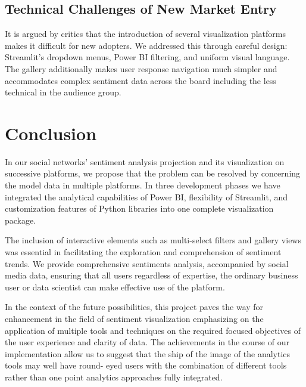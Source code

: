 \documentclass[conference]{IEEEtran}
\begin{document}
\subsection{Technical Challenges of New Market Entry}

It is argued by critics that the introduction of several visualization platforms makes it difficult for new adopters. We addressed this through careful design: Streamlit’s dropdown menus, Power BI filtering, and uniform visual language. The gallery additionally makes user response navigation much simpler and accommodates complex sentiment data across the board including the less technical in the audience group.

\section{Conclusion}

In our social networks’ sentiment analysis projection and its visualization on successive platforms, we propose that the problem can be resolved by concerning the model data in multiple platforms. In three development phases we have integrated the analytical capabilities of Power BI, flexibility of Streamlit, and customization features of Python libraries into one complete visualization package.

The inclusion of interactive elements such as multi-select filters and gallery views was essential in facilitating the exploration and comprehension of sentiment trends. We provide comprehensive sentiments analysis, accompanied by social media data, ensuring that all users regardless of expertise, the ordinary business user or data scientist can make effective use of the platform.

In the context of the future possibilities, this project paves the way for enhancement in the field of sentiment visualization emphasizing on the application of multiple tools and techniques on the required focused objectives of the user experience and clarity of data. The achievements in the course of our implementation allow us to suggest that the ship of the image of the analytics tools may well have round- eyed users with the combination of different tools rather than one point analytics approaches fully integrated.
\end{document}

